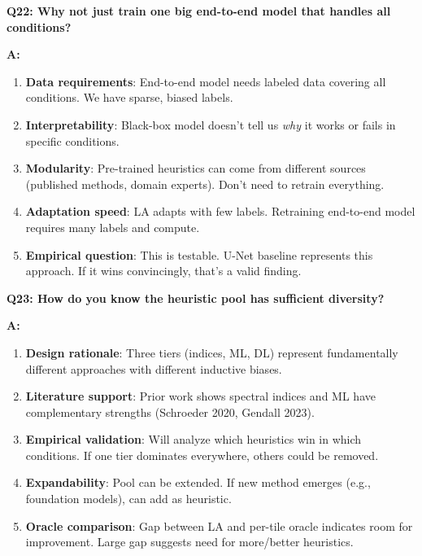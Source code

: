 \documentclass[11pt]{article}
\begin{document}
\textbf{Q22: Why not just train one big end-to-end model that handles all conditions?}

\textbf{A:}

\begin{enumerate}
    \item \textbf{Data requirements}: End-to-end model needs labeled data covering all conditions. We have sparse, biased labels.

    \item \textbf{Interpretability}: Black-box model doesn't tell us \textit{why} it works or fails in specific conditions.

    \item \textbf{Modularity}: Pre-trained heuristics can come from different sources (published methods, domain experts). Don't need to retrain everything.

    \item \textbf{Adaptation speed}: LA adapts with few labels. Retraining end-to-end model requires many labels and compute.

    \item \textbf{Empirical question}: This is testable. U-Net baseline represents this approach. If it wins convincingly, that's a valid finding.
\end{enumerate}

\textbf{Q23: How do you know the heuristic pool has sufficient diversity?}

\textbf{A:}

\begin{enumerate}
    \item \textbf{Design rationale}: Three tiers (indices, ML, DL) represent fundamentally different approaches with different inductive biases.

    \item \textbf{Literature support}: Prior work shows spectral indices and ML have complementary strengths (Schroeder 2020, Gendall 2023).

    \item \textbf{Empirical validation}: Will analyze which heuristics win in which conditions. If one tier dominates everywhere, others could be removed.

    \item \textbf{Expandability}: Pool can be extended. If new method emerges (e.g., foundation models), can add as heuristic.

    \item \textbf{Oracle comparison}: Gap between LA and per-tile oracle indicates room for improvement. Large gap suggests need for more/better heuristics.
\end{enumerate}
\end{document}
